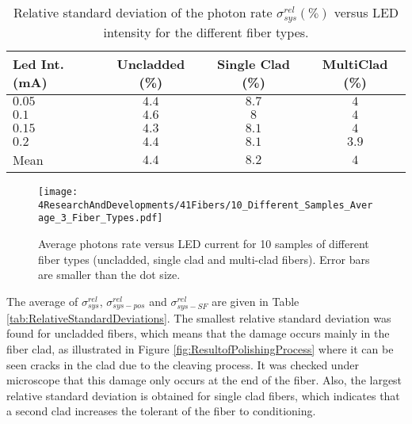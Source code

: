 \begin{table}[h]
\centering{}%
\begin{tabular}{lccc}
\toprule 
Led Int. (mA) & Uncladded (\%) & Single Clad (\%) & MultiClad (\%) \tabularnewline
\midrule
\midrule 
$0.05$ & $4.4$ & $8.7$ & $4$ \tabularnewline
$0.1$ & $4.6$ & $8$ & $4$ \tabularnewline
$0.15$ & $4.3$ & $8.1$ & $4$ \tabularnewline
$0.2$ & $4.4$ & $8.1$ & $3.9$ \tabularnewline
\midrule 
Mean & $4.4$ & $8.2$ & $4$ \tabularnewline
\bottomrule
\end{tabular}
\caption{Relative standard deviation of the photon rate $\sigma^{rel}_{sys}(\%)$ versus LED intensity for the different fiber types.}
\label{tab:RelativeStandardDeviation3FiberTypes}
\end{table}

\begin{figure}[h]
\centering
\texttt{[image: 4ResearchAndDevelopments/41Fibers/10\_Different\_Samples\_Average\_3\_Fiber\_Types.pdf]}
\caption{Average photons rate versus LED current for 10 samples of different fiber types (uncladded, single clad and multi-clad fibers). Error bars are smaller than the dot size.\label{fig:AveregeThreeFiberTypes}}
\end{figure}



The average of $\sigma^{rel}_{sys}$, $\sigma^{rel}_{sys-pos}$ and $\sigma^{rel}_{sys-SF}$ are given in Table \ref{tab:RelativeStandardDeviations}. The smallest relative standard deviation was found for uncladded fibers, which means that the damage occurs mainly in the fiber clad, as illustrated in Figure \ref{fig:ResultofPolishingProcess} where it can be seen cracks in the clad due to the cleaving process. It was checked under microscope that this damage only occurs at the end of the fiber. Also, the largest relative standard deviation is obtained for single clad fibers, which indicates that a second clad increases the tolerant of the fiber to conditioning.

